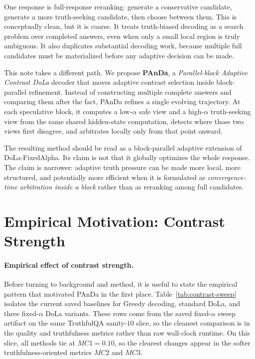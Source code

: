 \documentclass[10pt,twocolumn]{article}
\begin{document}
One response is full-response reranking: generate a conservative candidate, generate a more truth-seeking candidate, then choose between them. This is conceptually clean, but it is coarse. It treats truth-biased decoding as a search problem over completed answers, even when only a small local region is truly ambiguous. It also duplicates substantial decoding work, because multiple full candidates must be materialized before any adaptive decision can be made.

This note takes a different path. We propose \textbf{PAnDa}, a \emph{Parallel-block Adaptive Contrast DoLa} decoder that moves adaptive contrast selection inside block-parallel refinement. Instead of constructing multiple complete answers and comparing them after the fact, PAnDa refines a single evolving trajectory. At each speculative block, it computes a low-\(\alpha\) safe view and a high-\(\alpha\) truth-seeking view from the same shared hidden-state computation, detects where those two views first disagree, and arbitrates locally only from that point onward.

The resulting method should be read as a block-parallel adaptive extension of DoLa-FixedAlpha. Its claim is not that it globally optimizes the whole response. The claim is narrower: adaptive truth pressure can be made more local, more structured, and potentially more efficient when it is formulated as \emph{convergence-time arbitration inside a block} rather than as reranking among full candidates.

\section{Empirical Motivation: Contrast Strength}
\paragraph{Empirical effect of contrast strength.}
Before turning to background and method, it is useful to state the empirical pattern that motivated PAnDa in the first place. Table~\ref{tab:contrast-sweep} isolates the current saved baselines for Greedy decoding, standard DoLa, and three fixed-\(\alpha\) DoLa variants. These rows come from the saved fixed-\(\alpha\) sweep artifact on the same TruthfulQA sanity-\(10\) slice, so the cleanest comparison is in the quality and truthfulness metrics rather than raw wall-clock runtime. On this slice, all methods tie at \(MC1 = 0.10\), so the clearest changes appear in the softer truthfulness-oriented metrics \(MC2\) and \(MC3\).
\end{document}
